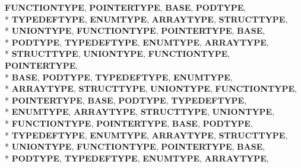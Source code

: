 \begin{DoxyCompactItemize}
{\bfseries F\-U\-N\-C\-T\-I\-O\-N\-T\-Y\-P\-E}, 
{\bfseries P\-O\-I\-N\-T\-E\-R\-T\-Y\-P\-E}, 
{\bfseries B\-A\-S\-E}, 
{\bfseries P\-O\-D\-T\-Y\-P\-E}, 
\\*
{\bfseries T\-Y\-P\-E\-D\-E\-F\-T\-Y\-P\-E}, 
{\bfseries E\-N\-U\-M\-T\-Y\-P\-E}, 
{\bfseries A\-R\-R\-A\-Y\-T\-Y\-P\-E}, 
{\bfseries S\-T\-R\-U\-C\-T\-T\-Y\-P\-E}, 
\\*
{\bfseries U\-N\-I\-O\-N\-T\-Y\-P\-E}, 
{\bfseries F\-U\-N\-C\-T\-I\-O\-N\-T\-Y\-P\-E}, 
{\bfseries P\-O\-I\-N\-T\-E\-R\-T\-Y\-P\-E}, 
{\bfseries B\-A\-S\-E}, 
\\*
{\bfseries P\-O\-D\-T\-Y\-P\-E}, 
{\bfseries T\-Y\-P\-E\-D\-E\-F\-T\-Y\-P\-E}, 
{\bfseries E\-N\-U\-M\-T\-Y\-P\-E}, 
{\bfseries A\-R\-R\-A\-Y\-T\-Y\-P\-E}, 
\\*
{\bfseries S\-T\-R\-U\-C\-T\-T\-Y\-P\-E}, 
{\bfseries U\-N\-I\-O\-N\-T\-Y\-P\-E}, 
{\bfseries F\-U\-N\-C\-T\-I\-O\-N\-T\-Y\-P\-E}, 
{\bfseries P\-O\-I\-N\-T\-E\-R\-T\-Y\-P\-E}, 
\\*
{\bfseries B\-A\-S\-E}, 
{\bfseries P\-O\-D\-T\-Y\-P\-E}, 
{\bfseries T\-Y\-P\-E\-D\-E\-F\-T\-Y\-P\-E}, 
{\bfseries E\-N\-U\-M\-T\-Y\-P\-E}, 
\\*
{\bfseries A\-R\-R\-A\-Y\-T\-Y\-P\-E}, 
{\bfseries S\-T\-R\-U\-C\-T\-T\-Y\-P\-E}, 
{\bfseries U\-N\-I\-O\-N\-T\-Y\-P\-E}, 
{\bfseries F\-U\-N\-C\-T\-I\-O\-N\-T\-Y\-P\-E}, 
\\*
{\bfseries P\-O\-I\-N\-T\-E\-R\-T\-Y\-P\-E}, 
{\bfseries B\-A\-S\-E}, 
{\bfseries P\-O\-D\-T\-Y\-P\-E}, 
{\bfseries T\-Y\-P\-E\-D\-E\-F\-T\-Y\-P\-E}, 
\\*
{\bfseries E\-N\-U\-M\-T\-Y\-P\-E}, 
{\bfseries A\-R\-R\-A\-Y\-T\-Y\-P\-E}, 
{\bfseries S\-T\-R\-U\-C\-T\-T\-Y\-P\-E}, 
{\bfseries U\-N\-I\-O\-N\-T\-Y\-P\-E}, 
\\*
{\bfseries F\-U\-N\-C\-T\-I\-O\-N\-T\-Y\-P\-E}, 
{\bfseries P\-O\-I\-N\-T\-E\-R\-T\-Y\-P\-E}, 
{\bfseries B\-A\-S\-E}, 
{\bfseries P\-O\-D\-T\-Y\-P\-E}, 
\\*
{\bfseries T\-Y\-P\-E\-D\-E\-F\-T\-Y\-P\-E}, 
{\bfseries E\-N\-U\-M\-T\-Y\-P\-E}, 
{\bfseries A\-R\-R\-A\-Y\-T\-Y\-P\-E}, 
{\bfseries S\-T\-R\-U\-C\-T\-T\-Y\-P\-E}, 
\\*
{\bfseries U\-N\-I\-O\-N\-T\-Y\-P\-E}, 
{\bfseries F\-U\-N\-C\-T\-I\-O\-N\-T\-Y\-P\-E}, 
{\bfseries P\-O\-I\-N\-T\-E\-R\-T\-Y\-P\-E}, 
{\bfseries B\-A\-S\-E}, 
\\*
{\bfseries P\-O\-D\-T\-Y\-P\-E}, 
{\bfseries T\-Y\-P\-E\-D\-E\-F\-T\-Y\-P\-E}, 
{\bfseries E\-N\-U\-M\-T\-Y\-P\-E}, 
{\bfseries A\-R\-R\-A\-Y\-T\-Y\-P\-E}, 

\end{DoxyCompactItemize}
